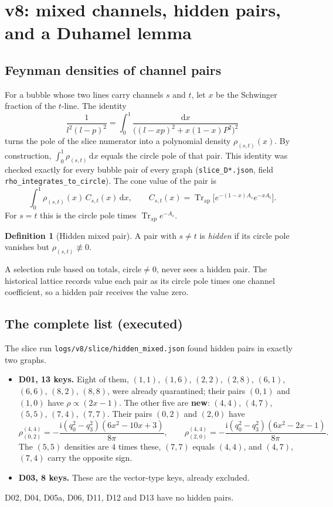 \documentclass[11pt,a4paper]{article}
\newcommand{\dd}{\mathrm d}
\newcommand{\ii}{\mathrm i}
\newcommand{\ApTr}{\operatorname{Tr}_{\mathrm{ap}}}
\newcommand{\loc}[1]{\nolinkurl{#1}}
\theoremstyle{plain}
\theoremstyle{definition}
\newtheorem{definition}[theorem]{Definition}
\theoremstyle{remark}
\numberwithin{equation}{section}
\begin{document}
\section{v8: mixed channels, hidden pairs, and a Duhamel lemma}
\label{sec:v8mixed}

\subsection{Feynman densities of channel pairs}

For a bubble whose two lines carry channels \(s\) and \(t\), let
\(x\) be the Schwinger fraction of the \(t\)-line. The identity
\[
 \frac1{l^2(l-p)^2}=\int_0^1\frac{\dd x}{\bigl((l-xp)^2+x(1-x)P^2\bigr)^2}
\]
turns the pole of the slice numerator into a polynomial density
\(\rho_{(s,t)}(x)\). By construction,
\(\int_0^1\rho_{(s,t)}\,\dd x\) equals the circle pole of that pair.
This identity was checked exactly for every bubble pair of every
graph (\loc{slice_D*.json}, field \loc{rho_integrates_to_circle}).
The cone value of the pair is
\[
 \int_0^1\rho_{(s,t)}(x)\,C_{s,t}(x)\,\dd x,\qquad
 C_{s,t}(x)=\ApTr\bigl[e^{-(1-x)A_s}e^{-xA_t}\bigr].
\]
For \(s=t\) this is the circle pole times \(\ApTr e^{-A_s}\).

\begin{definition}[Hidden mixed pair]
A pair with \(s\ne t\) is \emph{hidden} if its circle pole vanishes
but \(\rho_{(s,t)}\not\equiv0\).
\end{definition}

A selection rule based on totals, \(\text{circle}\ne0\), never sees
a hidden pair. The historical lattice records value each pair as
its circle pole times one channel coefficient, so a hidden pair
receives the value zero.

\subsection{The complete list (executed)}

The slice run \loc{logs/v8/slice/hidden_mixed.json} found hidden
pairs in exactly two graphs.
\begin{itemize}
\item \textbf{D01, 13 keys.} Eight of them, \((1,1)\), \((1,6)\),
\((2,2)\), \((2,8)\), \((6,1)\), \((6,6)\), \((8,2)\), \((8,8)\),
were already quarantined; their pairs \((0,1)\) and \((1,0)\) have
\(\rho\propto(2x-1)\).
The other five are \textbf{new}: \((4,4)\), \((4,7)\), \((5,5)\),
\((7,4)\), \((7,7)\). Their pairs \((0,2)\) and \((2,0)\) have
\[
 \rho^{(4,4)}_{(0,2)}=-\frac{\ii(q_0^2-q_3^2)(6x^2-10x+3)}{8\pi},\qquad
 \rho^{(4,4)}_{(2,0)}=-\frac{\ii(q_0^2-q_3^2)(6x^2-2x-1)}{8\pi}.
\]
The \((5,5)\) densities are \(4\) times these, \((7,7)\) equals
\((4,4)\), and \((4,7)\), \((7,4)\) carry the opposite sign.
\item \textbf{D03, 8 keys.} These are the vector-type keys,
already excluded.
\end{itemize}
D02, D04, D05a, D06, D11, D12 and D13 have no hidden pairs.
\end{document}
